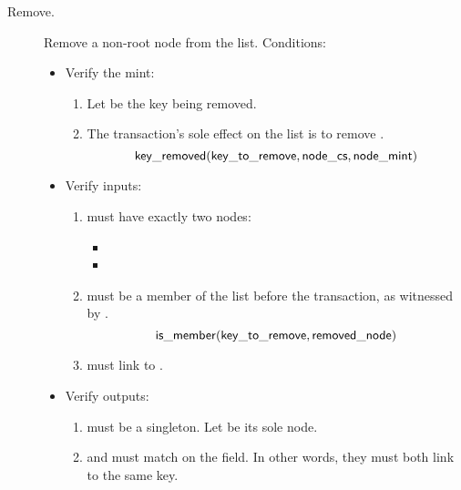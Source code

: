 \documentclass[../midgard.tex]{subfiles}
\begin{document}
\begin{description}
    \item[Remove.] Remove a non-root node from the list.
      Conditions:
        \begin{itemize}
            \item Verify the mint:
            \begin{enumerate}
                \item Let  be the key being removed.
                \item The transaction's sole effect on the list is to remove .
                    \begin{equation*}
                        \mathsf{key\_removed}(\mathsf{key\_to\_remove}, \mathsf{node\_cs}, \mathsf{node\_mint})
                    \end{equation*}
            \end{enumerate}
            
            \item Verify inputs:
            \begin{enumerate}[resume]
                \item {} must have exactly two nodes:
                    \begin{itemize}
                        \item {}
                        \item {}
                    \end{itemize}
                \item {} must be a member of the list before the transaction, as witnessed by .
                    \begin{equation*}
                        \mathsf{is\_member} (\mathsf{key\_to\_remove}, \mathsf{removed\_node})
                    \end{equation*}
                \item {} must link to .
            \end{enumerate}

            \item Verify outputs:
            \begin{enumerate}[resume]
                \item {} must be a singleton.
                  Let  be its sole node.
                \item {} and  must match on the  field.
                  In other words, they must both link to the same key.
            \end{enumerate}
            

\end{itemize}
\end{description}
\end{document}
